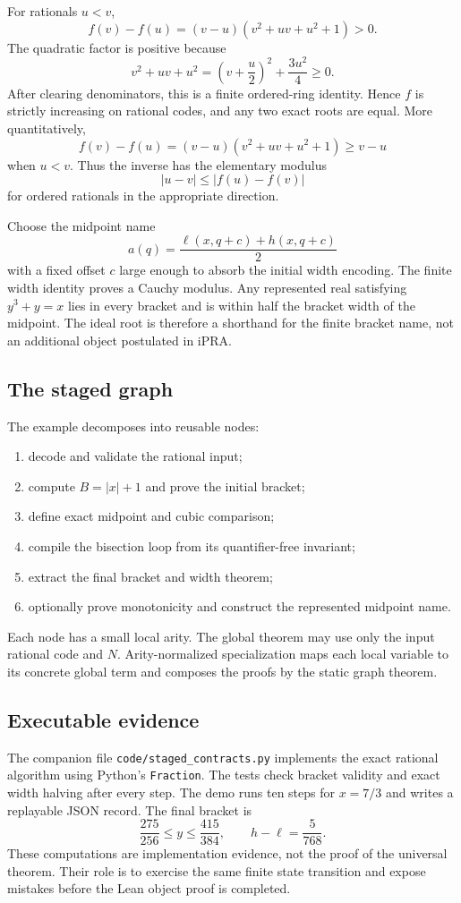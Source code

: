 For rationals \(u<v\),
\[
 f(v)-f(u)
 =(v-u)(v^2+uv+u^2+1)>0.
\]
The quadratic factor is positive because
\[
 v^2+uv+u^2
 =\left(v+\frac u2\right)^2+\frac{3u^2}{4}\ge0.
\]
After clearing denominators, this is a finite ordered-ring identity.  Hence \(f\) is strictly increasing
on rational codes, and any two exact roots are equal.  More quantitatively,
\[
 f(v)-f(u)=(v-u)(v^2+uv+u^2+1)\ge v-u
\]
when \(u<v\).  Thus the inverse has the elementary modulus
\[
 |u-v|\le |f(u)-f(v)|
\]
for ordered rationals in the appropriate direction.

Choose the midpoint name
\[
 a(q)=\frac{\ell(x,q+c)+h(x,q+c)}2
\]
with a fixed offset \(c\) large enough to absorb the initial width encoding.  The finite width identity
proves a Cauchy modulus.  Any represented real satisfying \(y^3+y=x\) lies in every bracket and is within
half the bracket width of the midpoint.  The ideal root is therefore a shorthand for the finite bracket
name, not an additional object postulated in iPRA.

\subsection{The staged graph}

The example decomposes into reusable nodes:
\begin{enumerate}
  \item decode and validate the rational input;
  \item compute \(B=|x|+1\) and prove the initial bracket;
  \item define exact midpoint and cubic comparison;
  \item compile the bisection loop from its quantifier-free invariant;
  \item extract the final bracket and width theorem;
  \item optionally prove monotonicity and construct the represented midpoint name.
\end{enumerate}
Each node has a small local arity.  The global theorem may use only the input rational code and \(N\).
Arity-normalized specialization maps each local variable to its concrete global term and composes the
proofs by the static graph theorem.

\subsection{Executable evidence}

The companion file \texttt{code/staged\_contracts.py} implements the exact rational algorithm using
Python's \texttt{Fraction}.  The tests check bracket validity and exact width halving after every step.  The
demo runs ten steps for \(x=7/3\) and writes a replayable JSON record.  The final bracket is
\[
 \frac{275}{256}\le y\le\frac{415}{384},
 \qquad h-\ell=\frac{5}{768}.
\]
These computations are implementation evidence, not the proof of the universal theorem.  Their role is to
exercise the same finite state transition and expose mistakes before the Lean object proof is completed.
